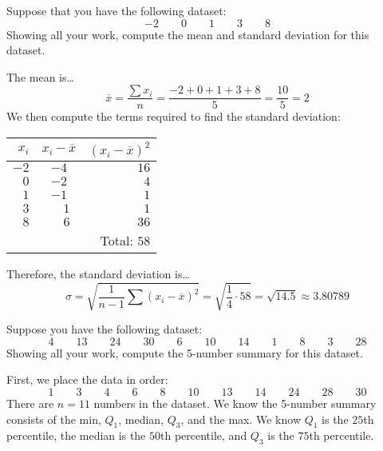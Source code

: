 \documentclass[12pt,letterpaper]{exam}
\begin{document}
\begin{questions}
\newpage
\question[10] Suppose that you have the following dataset:
	\[
	-2 \qquad 0 \qquad 1 \qquad 3 \qquad 8
	\]
Showing all your work, compute the mean and standard deviation for this dataset. \pspace

\sol The mean is\dots
	\[
	\overline{x}= \dfrac{\sum x_i}{n}= \dfrac{-2 + 0 + 1 + 3 + 8}{5}= \dfrac{10}{5}= 2
	\]
We then compute the terms required to find the standard deviation: \par
	\begin{table}[ht]
	\centering
	\begin{tabular}{rcr}
	$x_i$ & $x_i - \overline{x}$ & $(x_i - \overline{x})^2$ \\ \hline
	$-2$ & $-4$ & $16$ \\
	$0$ & $-2$ & $4$ \\
	$1$ & $-1$ & $1$ \\
	$3$ & $\phantom{-}1$ & $1$ \\
	$8$ & $\phantom{-}6$ & $36$ \\ \cline{3-3}
		& & Total: $58$
	\end{tabular}
	\end{table} \par
Therefore, the standard deviation is\dots
	\[
	\sigma= \sqrt{\dfrac{1}{n - 1} \sum (x_i - \overline{x})^2}= \sqrt{\dfrac{1}{4} \cdot 58}= \sqrt{14.5} \approx 3.80789
	\]



\newpage
\question[10] Suppose you have the following dataset:
	\[
	4 \qquad 13 \qquad 24 \qquad 30 \qquad 6 \qquad 10 \qquad 14 \qquad 1 \qquad 8 \qquad 3 \qquad 28
	\]
Showing all your work, compute the 5-number summary for this dataset. \pspace

\sol First, we place the data in order:
	\[
	1 \qquad 3 \qquad 4 \qquad 6 \qquad 8 \qquad 10 \qquad 13 \qquad 14 \qquad 24 \qquad 28 \qquad 30
	\]
There are $n= 11$ numbers in the dataset. We know the 5-number summary consists of the min, $Q_1$, median, $Q_3$, and the max. We know $Q_1$ is the $25$th percentile, the median is the $50$th percentile, and $Q_3$ is the $75$th percentile. \pspace


\end{questions}
\end{document}
